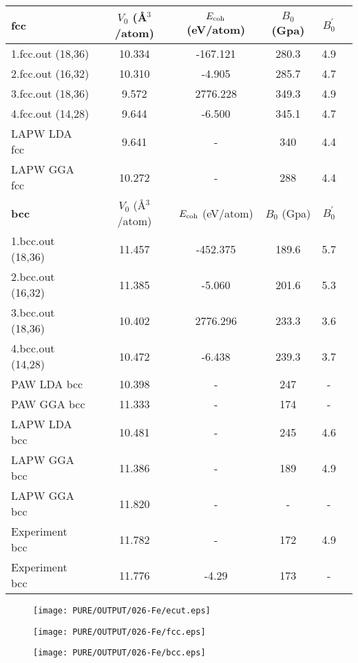 \documentclass[onecolumn]{revtex4}
\begin{document}
\begin{center}
\begin{tabular}{lccccc}
\hline
\hline
\bf{fcc}&$V_0$ (\AA$^3$/atom)&$E_{\rm coh}$ (eV/atom)&$B_0$ (Gpa)&$B_0^{'}$& \\
\hline
1.fcc.out (18,36)& 10.334 &-167.121 & 280.3 & 4.9 & \\ 
2.fcc.out (16,32)& 10.310 &-4.905 & 285.7 & 4.7 & \\ 
3.fcc.out (18,36)& 9.572 & 2776.228 & 349.3 & 4.9 & \\ 
4.fcc.out (14,28)& 9.644 &-6.500 & 345.1 & 4.7 & \\ 
LAPW LDA fcc~\cite{Stixrude_PRB50_1994} & 9.641 & - & 340 & 4.4 \\ %
LAPW GGA fcc~\cite{Stixrude_PRB50_1994} & 10.272 & - & 288 & 4.4 \\ %
\hline
\hline
\bf{bcc}&$V_0$ (\AA$^3$/atom)&$E_{\rm coh}$ (eV/atom)&$B_0$ (Gpa)&$B_0^{'}$& \\
\hline
1.bcc.out (18,36)& 11.457 &-452.375 & 189.6 & 5.7 & \\ 
2.bcc.out (16,32)& 11.385 &-5.060 & 201.6 & 5.3 & \\ 
3.bcc.out (18,36)& 10.402 & 2776.296 & 233.3 & 3.6 & \\ 
4.bcc.out (14,28)& 10.472 &-6.438 & 239.3 & 3.7 & \\ 
PAW LDA bcc~\cite{Kresse_PRB59_1999} & 10.398 & - & 247 & - \\ %
PAW GGA bcc~\cite{Kresse_PRB59_1999} & 11.333 & - & 174 & - \\ %
LAPW LDA bcc~\cite{Stixrude_PRB50_1994} & 10.481 & - & 245 & 4.6 \\ %
LAPW GGA bcc~\cite{Stixrude_PRB50_1994} & 11.386 & - & 189 & 4.9 \\ %
LAPW GGA bcc~\cite{Jing_PRB69_2003} & 11.820 & - & - & - \\ %
Experiment bcc~\cite{Stixrude_PRB50_1994} & 11.782 & - & 172 & 4.9 \\ %
Experiment bcc~\cite{Gong_PRB69_2004} & 11.776 & -4.29 & 173 & - \\ %
\hline
\hline
\end{tabular}
\end{center}
\begin{figure}[h] 
\centering 
\texttt{[image: PURE/OUTPUT/026-Fe/ecut.eps]}
\end{figure}
\begin{figure}[h] 
\centering 
\texttt{[image: PURE/OUTPUT/026-Fe/fcc.eps]}
\end{figure}
\begin{figure}[h] 
\centering 
\texttt{[image: PURE/OUTPUT/026-Fe/bcc.eps]}
\end{figure}
\newpage
\end{document}
